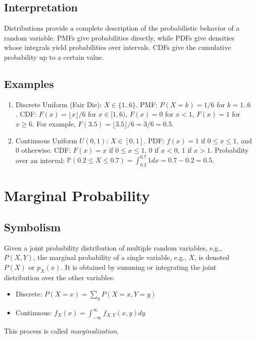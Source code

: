 \documentclass{article}
\newcommand{\Prob}{\mathbb{P}} %
\begin{document}
\subsection*{Interpretation}
Distributions provide a complete description of the probabilistic behavior of a random variable. PMFs give probabilities directly, while PDFs give densities whose integrals yield probabilities over intervals. CDFs give the cumulative probability up to a certain value.

\subsection*{Examples}
\begin{enumerate}
    \item Discrete Uniform (Fair Die): $X \in \{1..6\}$. PMF: $P(X=k) = 1/6$ for $k=1..6$. CDF: $F(x) = \lfloor x \rfloor / 6$ for $x \in [1, 6)$, $F(x)=0$ for $x<1$, $F(x)=1$ for $x \ge 6$. For example, $F(3.5) = \lfloor 3.5 \rfloor / 6 = 3/6 = 0.5$.
    \item Continuous Uniform $U(0, 1)$: $X \in [0, 1]$. PDF: $f(x) = 1$ if $0 \le x \le 1$, and $0$ otherwise. CDF: $F(x) = x$ if $0 \le x \le 1$, $0$ if $x < 0$, $1$ if $x > 1$. Probability over an interval: $\Prob(0.2 \le X \le 0.7) = \int_{0.2}^{0.7} 1 dx = 0.7 - 0.2 = 0.5$.
\end{enumerate}

\section{Marginal Probability}

\subsection*{Symbolism}
Given a joint probability distribution of multiple random variables, e.g., $P(X, Y)$, the marginal probability of a single variable, e.g., $X$, is denoted $P(X)$ or $p_X(x)$. It is obtained by summing or integrating the joint distribution over the other variables:
\begin{itemize}
    \item Discrete: $P(X=x) = \sum_{y} P(X=x, Y=y)$
    \item Continuous: $f_X(x) = \int_{-\infty}^{\infty} f_{X,Y}(x, y) dy$
\end{itemize}
This process is called \emph{marginalization}.
\end{document}

